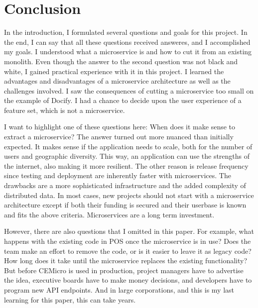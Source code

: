 \chapter{Conclusion}
\label{sec:cunclusion}

In the introduction, I formulated several questions and goals for this project. In the end, I can say that all these questions received answeres, and I accomplished my goals. I understood what a microservice is and how to cut it from an existing monolith. Even though the answer to the second question was not black and white, I gained practical experience with it in this project. I learned the advantages and disadvantages of a microservice architecture as well as the challenges involved. I saw the consequences of cutting a microservice too small on the example of Docify. I had a chance to decide upon the user experience of a feature set, which is not a microservice.

I want to highlight one of these questions here: When does it make sense to extract a microservice? The answer turned out more nuanced than initially expected. It makes sense if the application needs to scale, both for the number of users and geographic diversity. This way, an application can use the strengths of the internet, also making it more resilient. The other reason is release frequency since testing and deployment are inherently faster with microservices. The drawbacks are a more sophisticated infrastructure and the added complexity of distributed data. In most cases, new projects should not start with a microservice architecture except if both their funding is secured and their userbase is known and fits the above criteria. Microservices are a long term investment.

However, there are also questions that I omitted in this paper. For example, what happens with the existing code in POS once the microservice is in use? Does the team make an effort to remove the code, or is it easier to leave it as legacy code? How long does it take until the microservice replaces the existing functionality? But before CEMicro is used in production, project managers have to advertise the idea, executive boards have to make money decisions, and developers have to program new API endpoints. And in large corporations, and this is my last learning for this paper, this can take years.

